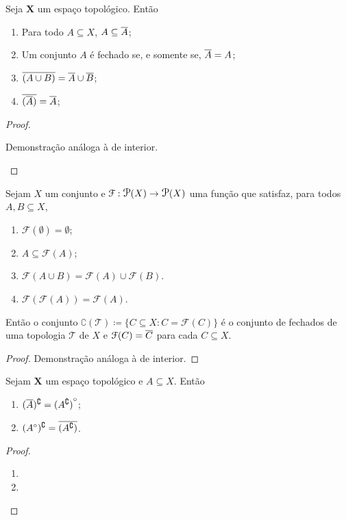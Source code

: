 \begin{prop}
	Seja $\bm X$ um espaço topológico. Então
	\begin{enumerate}	
	\item Para todo $A \subseteq X$, $A \subseteq \overline{A}$;
	\item Um conjunto $A$ é fechado se, e somente se, $\overline{A}=A$;
	\item $\overline{(A \cup B)} = \overline{A} \cup \overline{B}$;
	\item $\overline{(\overline{A})} = \overline{A}$;
	\end{enumerate}
\end{prop}
\begin{proof}
	\begin{enumerate}
	Demonstração análoga à de interior.
	\end{enumerate}
\end{proof}

\begin{prop}
	Sejam $X$ um conjunto e $\mathcal F: \p(X) \to \p(X)$ uma função que satisfaz, para todos $A,B \subseteq X$,
	\begin{enumerate}
	\item $\mathcal F(\emptyset) = \emptyset$;
	\item $A \subseteq \mathcal F(A)$;
	\item $\mathcal F(A \cup B) = \mathcal F(A) \cup \mathcal F(B)$.
	\item $\mathcal F(\mathcal F(A)) = \mathcal F(A)$.
	\end{enumerate}
	
Então o conjunto $\complement(\mathcal T) \coloneqq \{C \subseteq X : C = \mathcal F(C)\}$ é o conjunto de fechados de uma topologia $\mathcal T$ de $X$ e $\mathcal F(C) = \overline{C}$ para cada $C \subseteq X$.
\end{prop}
\begin{proof}
	Demonstração análoga à de interior.
\end{proof}


\begin{prop}
	Sejam $\bm X$ um espaço topológico e $A \subseteq X$. Então
	\begin{enumerate}
	\item $(\overline{A})^\complement = {(A^\complement)}^\circ$;
	\item $({A}^\circ)^\complement = \overline{(A^\complement)}$.
	\end{enumerate}
\end{prop}
\begin{proof}
	\begin{enumerate}
	\item
	\item
	\end{enumerate}
\end{proof}



